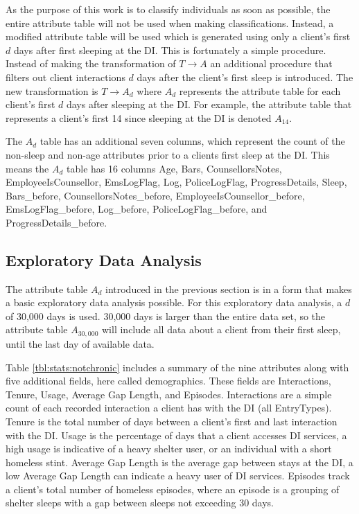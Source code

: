 As the purpose of this work is to classify individuals as soon as possible, the entire attribute table will not be used when making classifications. Instead, a modified attribute table will be used which is generated using only a client's first $d$ days after first sleeping at the DI. 
This is fortunately a simple procedure. Instead of making the transformation of $T \rightarrow A$ an additional procedure that filters out client interactions $d$ days after the client's first sleep is introduced. The new transformation is $T \rightarrow A_d$ where $A_d$ represents the attribute table for each client's first $d$ days after sleeping at the DI. For example, the attribute table that represents a client's first 14 since sleeping at the DI is denoted $A_{14}$.

 The $A_d$ table has an additional seven columns, which represent the count of the non-sleep and non-age attributes prior to a clients first sleep at the DI. This means the $A_d$ table has 16 columns Age, Bars, CounsellorsNotes, EmployeeIsCounsellor, EmsLogFlag, Log, PoliceLogFlag, ProgressDetails, Sleep, Bars\_before, CounsellorsNotes\_before, EmployeeIsCounsellor\_before, EmsLogFlag\_before, Log\_before, PoliceLogFlag\_before, and ProgressDetails\_before.


\subsection{Exploratory Data Analysis} \label{chap:data:characteristics}

The attribute table $A_d$ introduced in the previous section is in a form that makes a basic exploratory data analysis possible. For this exploratory data analysis, a $d$ of 30,000 days is used. 30,000 days is larger than the entire data set, so the attribute table $A_{30,000}$ will include all data about a client from their first sleep, until the last day of available data.

Table \ref{tbl:stats:notchronic} includes a summary of the nine attributes along with five additional fields, here called demographics. These fields are Interactions, Tenure, Usage, Average Gap Length, and Episodes. Interactions are a simple count of each recorded interaction a client has with the DI (all EntryTypes). Tenure is the total number of days between a client's first and last interaction with the DI. Usage is the percentage of days that a client accesses DI services, a high usage is indicative of a heavy shelter user, or an individual with a short homeless stint. Average Gap Length is the average gap between stays at the DI, a low Average Gap Length can indicate a heavy user of DI services. Episodes track a client's total number of homeless episodes, where an episode is a grouping of shelter sleeps with a gap between sleeps not exceeding 30 days.

